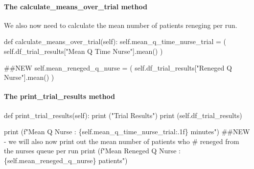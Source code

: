 \documentclass[
  letterpaper,
  DIV=11,
  numbers=noendperiod]{scrreprt}
\let\oldparagraph\paragraph
\renewcommand{\paragraph}[1]{\oldparagraph{#1}\mbox{}}
\newenvironment{Shaded}{\begin{snugshade}}{\end{snugshade}}
\newcommand{\BuiltInTok}[1]{\textcolor[rgb]{0.00,0.23,0.31}{#1}}
\newcommand{\CommentTok}[1]{\textcolor[rgb]{0.37,0.37,0.37}{#1}}
\newcommand{\KeywordTok}[1]{\textcolor[rgb]{0.00,0.23,0.31}{#1}}
\newcommand{\NormalTok}[1]{\textcolor[rgb]{0.00,0.23,0.31}{#1}}
\newcommand{\OperatorTok}[1]{\textcolor[rgb]{0.37,0.37,0.37}{#1}}
\newcommand{\SpecialCharTok}[1]{\textcolor[rgb]{0.37,0.37,0.37}{#1}}
\newcommand{\SpecialStringTok}[1]{\textcolor[rgb]{0.13,0.47,0.30}{#1}}
\newcommand{\StringTok}[1]{\textcolor[rgb]{0.13,0.47,0.30}{#1}}
\newcommand{\VariableTok}[1]{\textcolor[rgb]{0.07,0.07,0.07}{#1}}
\begin{document}
\paragraph{The calculate\_means\_over\_trial
method}\label{the-calculate_means_over_trial-method}

We also now need to calculate the mean number of patients reneging per
run.

\begin{Shaded}
\begin{Highlighting}[]
\KeywordTok{def}\NormalTok{ calculate\_means\_over\_trial(}\VariableTok{self}\NormalTok{):}
    \VariableTok{self}\NormalTok{.mean\_q\_time\_nurse\_trial }\OperatorTok{=}\NormalTok{ (}
        \VariableTok{self}\NormalTok{.df\_trial\_results[}\StringTok{"Mean Q Time Nurse"}\NormalTok{].mean()}
\NormalTok{    )}

    \CommentTok{\#\#NEW}
    \VariableTok{self}\NormalTok{.mean\_reneged\_q\_nurse }\OperatorTok{=}\NormalTok{ (}
        \VariableTok{self}\NormalTok{.df\_trial\_results[}\StringTok{"Reneged Q Nurse"}\NormalTok{].mean()}
\NormalTok{    )}
\end{Highlighting}
\end{Shaded}

\paragraph{The print\_trial\_results
method}\label{the-print_trial_results-method}

\begin{Shaded}
\begin{Highlighting}[]
\KeywordTok{def}\NormalTok{ print\_trial\_results(}\VariableTok{self}\NormalTok{):}
    \BuiltInTok{print}\NormalTok{ (}\StringTok{"Trial Results"}\NormalTok{)}
    \BuiltInTok{print}\NormalTok{ (}\VariableTok{self}\NormalTok{.df\_trial\_results)}

    \BuiltInTok{print}\NormalTok{ (}\SpecialStringTok{f"Mean Q Nurse : }\SpecialCharTok{\{}\VariableTok{self}\SpecialCharTok{.}\NormalTok{mean\_q\_time\_nurse\_trial}\SpecialCharTok{:.1f\}}\SpecialStringTok{ minutes"}\NormalTok{)}
    \CommentTok{\#\#NEW {-} we will also now print out the mean number of patients who}
    \CommentTok{\# reneged from the nurse\textquotesingle{}s queue per run}
    \BuiltInTok{print}\NormalTok{ (}\SpecialStringTok{f"Mean Reneged Q Nurse : }\SpecialCharTok{\{}\VariableTok{self}\SpecialCharTok{.}\NormalTok{mean\_reneged\_q\_nurse}\SpecialCharTok{\}}\SpecialStringTok{ patients"}\NormalTok{)}
\end{Highlighting}
\end{Shaded}
\end{document}
